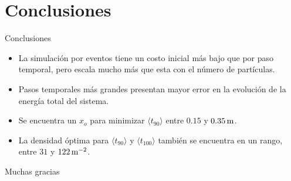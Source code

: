\documentclass[aspectratio=169]{beamer}
\begin{document}

\section{Conclusiones}

\begin{frame}{Conclusiones}
  \begin{itemize}\setlength{\itemsep}{1em}
    \item La simulación por eventos tiene un costo inicial más bajo que por paso temporal, pero
      escala mucho más que esta con el número de partículas.
    \item Pasos temporales más grandes presentan mayor error en la evolución de la energía total
      del sistema.
    \item Se encuentra un $x_o$ para minimizar $\langle t_{90} \rangle$ entre $0.15$ y
      $0.35\,\mathrm{m}$.
    \item La densidad óptima para $\langle t_{90} \rangle$ y $\langle t_{100} \rangle$ también se
      encuentra en un rango, entre $31$ y $122\,\mathrm{m^{-2}}$.
  \end{itemize}
\end{frame}

\begin{frame}[plain]
  \centering
  \vfill
  {\Huge Muchas gracias}
  \vfill
\end{frame}
\end{document}
